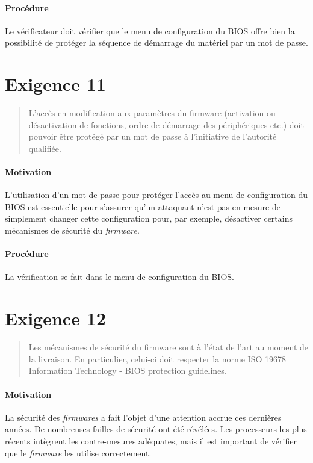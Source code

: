 \documentclass{report}
\begin{document}
\paragraph{Procédure}
%
Le vérificateur doit vérifier que le menu de configuration du BIOS offre bien la
possibilité de protéger la séquence de démarrage du matériel par un mot de
passe.

\section{Exigence 11}

\begin{quote}
  L’accès en modification aux paramètres du firmware (activation ou
  désactivation de fonctions, ordre de démarrage des périphériques etc.) doit
  pouvoir être protégé par un mot de passe à l’initiative de l’autorité
  qualifiée.
\end{quote}

\paragraph{Motivation}
%
L’utilisation d’un mot de passe pour protéger l’accès au menu de configuration
du BIOS est essentielle pour s’assurer qu’un attaquant n’est pas en mesure de
simplement changer cette configuration pour, par exemple, désactiver certains
mécanismes de sécurité du \emph{firmware}.

\paragraph{Procédure}
%
La vérification se fait dans le menu de configuration du BIOS.

\section{Exigence 12}

\begin{quote}
  Les mécanismes de sécurité du firmware sont à l’état de l’art au moment de la
  livraison.
  En particulier, celui-ci doit respecter la norme ISO 19678 Information
  Technology - BIOS protection guidelines.
\end{quote}

\paragraph{Motivation}
%
La sécurité des \emph{firmwares} a fait l’objet d’une attention accrue ces
dernières années.
%
De nombreuses failles de sécurité ont été révélées.
%
Les processeurs les plus récents intègrent les contre-mesures adéquates, mais il
est important de vérifier que le \emph{firmware} les utilise correctement.
\end{document}
